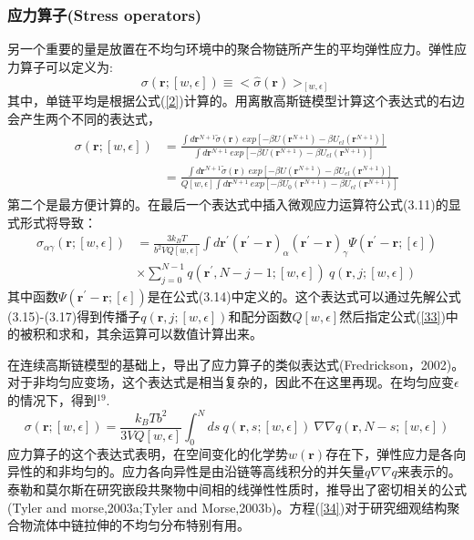 \subsubsection{应力算子(Stress operators)}
另一个重要的量是放置在不均匀环境中的聚合物链所产生的平均弹性应力。弹性应力算子可以定义为:
\begin{equation}\label{31}
\sigma(\mathbf{\mathbf{r}};[w,\epsilon])\equiv<\hat{\sigma}(\mathbf{r})>_{[w,\epsilon]}
\end{equation}
其中，单链平均是根据公式(\ref{2})计算的。用离散高斯链模型计算这个表达式的右边会产生两个不同的表达式，
\begin{align}\label{32}
\begin{split}
\sigma(\mathbf{r};[w,\epsilon])&=\frac{\int d\mathbf{r}^{N+1}{\tilde{\sigma}}(\mathbf{r})~exp[-\beta U(\mathbf{r}^{N+1})-\beta U_{el}(\mathbf{r}^{N+1})]}{\int d\mathbf{r}^{N+1}~exp[-\beta U(\mathbf{r}^{N+1})-\beta U_{el}(\mathbf{r}^{N+1})]}\\&=\frac{\int d\mathbf{r}^{N+1}\tilde{\sigma}(\mathbf{r})~exp[-\beta U(\mathbf{r}^{N+1})-\beta U_{el}(\mathbf{r}^{N+1})]}{Q[w,\epsilon]\int d\mathbf{r}^{N+1}~exp[-\beta U_0(\mathbf{r}^{N+1})-\beta U_{el}(\mathbf{r}^{N+1})]}
\end{split}
\end{align}
第二个是最方便计算的。在最后一个表达式中插入微观应力运算符公式(3.11)的显式形式将导致：
\begin{equation}
\begin{aligned}\label{33}
\sigma_{\alpha \gamma}(\mathbf{r};[w,\epsilon])&=\frac{3k_BT}{b^2VQ[w,\epsilon]} \int d\mathbf{r}^{'}(\mathbf{r}^{'}-\mathbf{r})_{\alpha} (\mathbf{r}^{'}-\mathbf{r})_{\gamma} \varPsi (\mathbf{r}^{'}-\mathbf{r};[\epsilon])\\&\times \sum_{j=0}^{N-1}q(\mathbf{r}^{'},N-j-1;[w,\epsilon])~q(\mathbf{r},j;[w,\epsilon])
\end{aligned}
\end{equation}
其中函数$\varPsi (\mathbf{r}^{'}-\mathbf{r};[\epsilon])$是在公式(3.14)中定义的。这个表达式可以通过先解公式(3.15)-(3.17)得到传播子$q(\mathbf{r},j;[w,\epsilon])$和配分函数$Q[w,\epsilon]$然后指定公式(\ref{33})中的被积和求和，其余运算可以数值计算出来。

在连续高斯链模型的基础上，导出了应力算子的类似表达式(Fredrickson，2002)。对于非均匀应变场，这个表达式是相当复杂的，因此不在这里再现。在均匀应变$\epsilon$的情况下，得到$^{19}$.
\begin{equation}\label{34}
\sigma(\mathbf{r};[w,\epsilon])=\frac{k_BTb^2}{3VQ[w,\epsilon]}\int_{0}^{N} ds~q(\mathbf{r},s;[w,\epsilon])~\nabla \nabla q(\mathbf{r},N-s;[w,\epsilon])
\end{equation}
应力算子的这个表达式表明，在空间变化的化学势$w(\mathbf{r})$存在下，弹性应力是各向异性的和非均匀的。应力各向异性是由沿链等高线积分的并矢量$q\nabla \nabla q$来表示的。泰勒和莫尔斯在研究嵌段共聚物中间相的线弹性性质时，推导出了密切相关的公式(Tyler and morse,2003a;Tyler and Morse,2003b)。方程(\ref{34})对于研究细观结构聚合物流体中链拉伸的不均匀分布特别有用。
